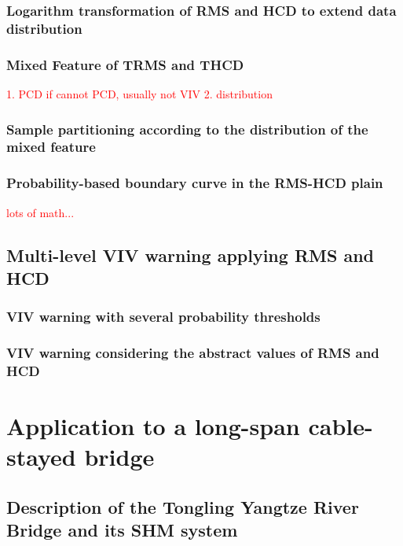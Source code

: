 \documentclass[preprint, 3p, times, compress, 11pt]{elsarticle}
\begin{document}
\subsubsection{Logarithm transformation of RMS and HCD to extend data 
        distribution}

\subsubsection{Mixed Feature of TRMS and THCD}

\textcolor{red}{
    1. PCD
    if cannot PCD, usually not VIV 
    2. distribution
}

\subsubsection{Sample partitioning according to the distribution of the 
        mixed feature}

\subsubsection{Probability-based boundary curve in the RMS-HCD plain}

\textcolor{red}{
    lots of math...
}

\subsection{Multi-level VIV warning applying RMS and HCD}

\subsubsection{VIV warning with several probability thresholds}

\subsubsection{VIV warning considering the abstract values of RMS and HCD}

\section{Application to a long-span cable-stayed bridge}
\label{sec:experiment}

\subsection{Description of the Tongling Yangtze River Bridge and its SHM system}
\end{document}
